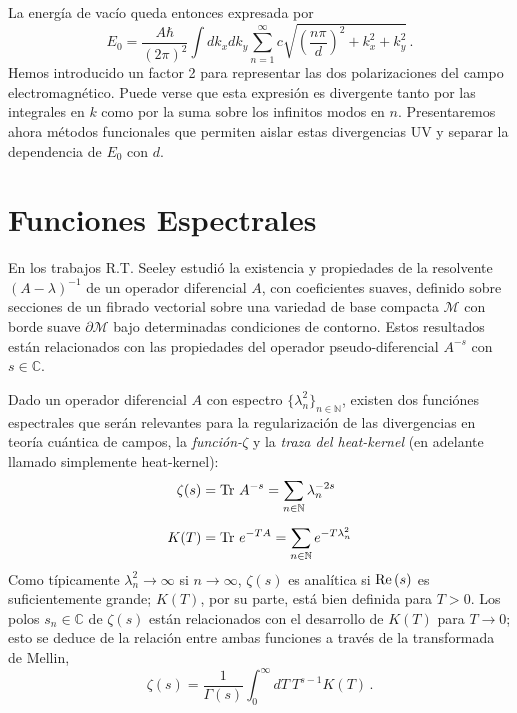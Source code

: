 La energía de vacío queda entonces expresada por
\begin{equation}
E _0 = \frac{A \hbar }{(2 \pi) ^2} \int dk _x dk _y 
\sum _{n=1} ^{\infty} 
c
\sqrt{
		\left( \frac{n \pi}{d} \right) ^2 + k _x ^2 + k _y ^2
		}\,.
\end{equation}
Hemos introducido un factor 2 para representar las dos polarizaciones del campo electromagnético. Puede verse que esta expresión es divergente tanto por las integrales en $k$ como por la suma sobre los infinitos modos en $n$. Presentaremos ahora métodos funcionales que permiten aislar estas divergencias UV y separar la dependencia de $E_0$ con $d$.

\section{Funciones Espectrales}

En los trabajos \cite{Seeley:1967ea,10.2307/2373309,10.2307/2373312} R.T. Seeley estudió la existencia y propiedades de la resolvente $(A - \lambda) ^{-1}$ de un operador diferencial $A$, con coeficientes suaves, definido sobre secciones de un fibrado vectorial sobre una variedad de base compacta $\mathcal{M}$ con borde suave $\partial \mathcal{M}$ bajo determinadas condiciones de contorno. Estos resultados están relacionados con las propiedades del operador pseudo-diferencial $A ^{-s}$ con $s \in \mathbb{C}$.



Dado un operador diferencial $A$ con espectro $\{ \lambda ^2 _n \} _{n \in \mathbb N}$, existen dos funciónes espectrales que serán relevantes para la regularización de las divergencias en teoría cuántica de campos, la {\it  función-$\zeta$} y la  {\it traza del  heat-kernel} (en adelante llamado simplemente heat-kernel):
\begin{align}
\zeta  (s) &= {\rm Tr}\ A ^{-s} = \sum \limits_{n \in \mathbb N}   \lambda _n ^{-2s} \label{funcion.zeta}\\[2mm]
K (T) &=  {\rm Tr} \ e ^{-T A} = \sum \limits_{n \in \mathbb N} e ^{-T \lambda ^2 _{n} }
\end{align}
Como típicamente $\lambda ^2 _n\to \infty$ si $n\to \infty$, $\zeta  (s) $ es analítica si ${\rm Re}\,(s)$ es suficientemente grande; $K(T)$, por su parte, está bien definida para $T>0$. Los polos $s _n \in\mathbb C$ de $\zeta(s)$ están relacionados con el desarrollo de $K(T)$ para $T\to 0$; esto se deduce de la relación entre ambas funciones a través de la transformada de Mellin,
\begin{equation}
\zeta (s) = \frac{1}{\Gamma (s) } 
\int _0 ^{\infty} dT \
T^{s-1} K(T) \,.
\label{eq.mellin}
\end{equation}

